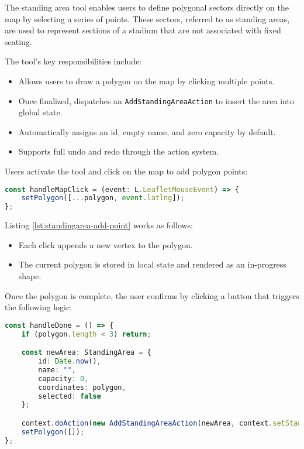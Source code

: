 The standing area tool enables users to define polygonal sectors directly on the map by selecting a series of points. These sectors, referred to as standing areas, are used to represent sections of a stadium that are not associated with fixed seating.

The tool’s key responsibilities include:
\begin{itemize}
    \item Allows users to draw a polygon on the map by clicking multiple points.
    \item Once finalized, dispatches an \texttt{AddStandingAreaAction} to insert the area into global state.
    \item Automatically assigns an id, empty name, and zero capacity by default.
    \item Supports full undo and redo through the action system.
\end{itemize}

Users activate the tool and click on the map to add polygon points:

\begin{lstlisting}[language=TypeScript, caption=Adding Polygon Points, label=lst:standingarea-add-point]
const handleMapClick = (event: L.LeafletMouseEvent) => {
    setPolygon([...polygon, event.latlng]);
};
\end{lstlisting}

Listing \ref{lst:standingarea-add-point} works as follows:
\begin{itemize}
    \item Each click appends a new vertex to the polygon.
    \item The current polygon is stored in local state and rendered as an in-progress shape.
\end{itemize}

Once the polygon is complete, the user confirms by clicking a button that triggers the following logic:

\newpage

\begin{lstlisting}[language=TypeScript, caption=Finalizing Standing Area, label=lst:standingarea-finalize]
const handleDone = () => {
    if (polygon.length < 3) return;

    const newArea: StandingArea = {
        id: Date.now(),
        name: "",
        capacity: 0,
        coordinates: polygon,
        selected: false
    };

    context.doAction(new AddStandingAreaAction(newArea, context.setStandingAreas));
    setPolygon([]);
};
\end{lstlisting}

